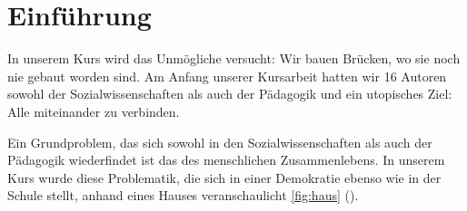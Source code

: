 \section{Einführung}
In unserem Kurs wird das Unmögliche versucht:
Wir bauen Brücken, wo sie noch nie gebaut worden sind.
Am Anfang unserer Kursarbeit hatten wir 16 Autoren sowohl der Sozialwissenschaften als auch der Pädagogik und ein utopisches Ziel: Alle miteinander zu verbinden.

Ein Grundproblem, das sich sowohl in den Sozialwissenschaften als auch der Pädagogik wiederfindet ist das des menschlichen Zusammenlebens.
In unserem Kurs wurde diese Problematik, die sich in einer Demokratie ebenso wie in der Schule stellt, anhand eines Hauses veranschaulicht \autoref{fig:haus} ().

